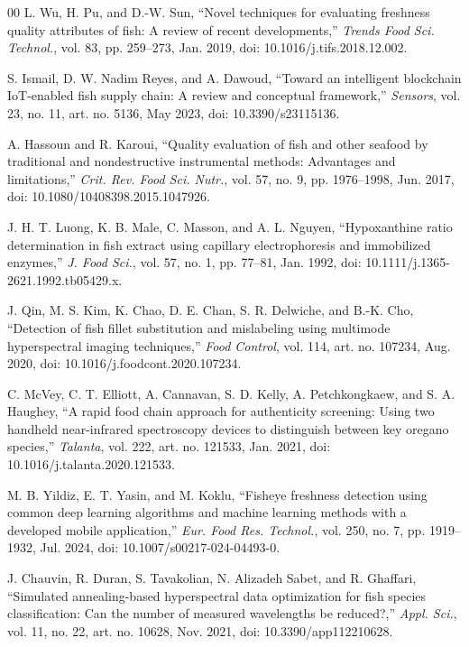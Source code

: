 \documentclass[conference]{IEEEtran}
\begin{document}
\balance
\begin{thebibliography}{00}
L. Wu, H. Pu, and D.-W. Sun, ``Novel techniques for evaluating freshness quality attributes of fish: A review of recent developments,'' \textit{Trends Food Sci. Technol.}, vol. 83, pp. 259--273, Jan. 2019, doi: 10.1016/j.tifs.2018.12.002.

S. Ismail, D. W. Nadim Reyes, and A. Dawoud, ``Toward an intelligent blockchain IoT-enabled fish supply chain: A review and conceptual framework,'' \textit{Sensors}, vol. 23, no. 11, art. no. 5136, May 2023, doi: 10.3390/s23115136.

A. Hassoun and R. Karoui, ``Quality evaluation of fish and other seafood by traditional and nondestructive instrumental methods: Advantages and limitations,'' \textit{Crit. Rev. Food Sci. Nutr.}, vol. 57, no. 9, pp. 1976--1998, Jun. 2017, doi: 10.1080/10408398.2015.1047926.

J. H. T. Luong, K. B. Male, C. Masson, and A. L. Nguyen, ``Hypoxanthine ratio determination in fish extract using capillary electrophoresis and immobilized enzymes,'' \textit{J. Food Sci.}, vol. 57, no. 1, pp. 77--81, Jan. 1992, doi: 10.1111/j.1365-2621.1992.tb05429.x.

J. Qin, M. S. Kim, K. Chao, D. E. Chan, S. R. Delwiche, and B.-K. Cho, ``Detection of fish fillet substitution and mislabeling using multimode hyperspectral imaging techniques,'' \textit{Food Control}, vol. 114, art. no. 107234, Aug. 2020, doi: 10.1016/j.foodcont.2020.107234.

C. McVey, C. T. Elliott, A. Cannavan, S. D. Kelly, A. Petchkongkaew, and S. A. Haughey, ``A rapid food chain approach for authenticity screening: Using two handheld near-infrared spectroscopy devices to distinguish between key oregano species,'' \textit{Talanta}, vol. 222, art. no. 121533, Jan. 2021, doi: 10.1016/j.talanta.2020.121533.

M. B. Yildiz, E. T. Yasin, and M. Koklu, ``Fisheye freshness detection using common deep learning algorithms and machine learning methods with a developed mobile application,'' \textit{Eur. Food Res. Technol.}, vol. 250, no. 7, pp. 1919--1932, Jul. 2024, doi: 10.1007/s00217-024-04493-0.

J. Chauvin, R. Duran, S. Tavakolian, N. Alizadeh Sabet, and R. Ghaffari, ``Simulated annealing-based hyperspectral data optimization for fish species classification: Can the number of measured wavelengths be reduced?,'' \textit{Appl. Sci.}, vol. 11, no. 22, art. no. 10628, Nov. 2021, doi: 10.3390/app112210628.


\end{thebibliography}
\end{document}
